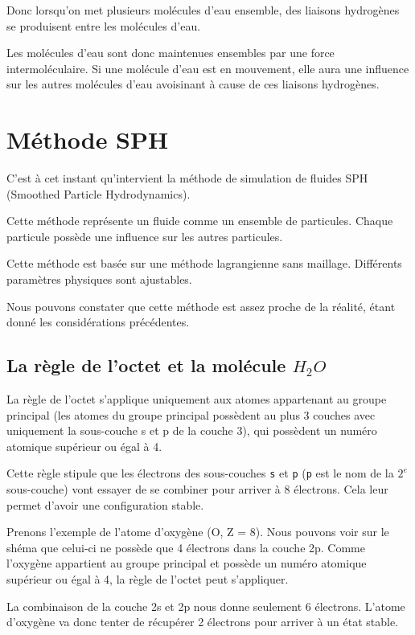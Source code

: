 \documentclass[
]{report}
\begin{document}
Donc lorsqu'on met plusieurs molécules d'eau ensemble, des liaisons
hydrogènes se produisent entre les molécules d'eau.

Les molécules d'eau sont donc maintenues ensembles par une force
intermoléculaire. Si une molécule d'eau est en mouvement, elle aura une
influence sur les autres molécules d'eau avoisinant à cause de ces
liaisons hydrogènes.

\section{Méthode SPH}\label{muxe9thode-sph}

C'est à cet instant qu'intervient la méthode de simulation de fluides
SPH (Smoothed Particle Hydrodynamics).

Cette méthode représente un fluide comme un ensemble de particules.
Chaque particule possède une influence sur les autres particules.

Cette méthode est basée sur une méthode lagrangienne sans maillage.
Différents paramètres physiques sont ajustables.

Nous pouvons constater que cette méthode est assez proche de la réalité,
étant donné les considérations précédentes.

\subsection{\texorpdfstring{La règle de l'octet et la molécule
\(H_{2}O\)}{La règle de l'octet et la molécule H\_\{2\}O}}\label{la-ruxe8gle-de-loctet-et-la-moluxe9cule-h_2o}

La règle de l'octet s'applique uniquement aux atomes appartenant au
groupe principal (les atomes du groupe principal possèdent au plus 3
couches avec uniquement la sous-couche s et p de la couche 3), qui
possèdent un numéro atomique supérieur ou égal à 4.

Cette règle stipule que les électrons des sous-couches \texttt{s} et
\texttt{p} (\texttt{p} est le nom de la \(2^e\) sous-couche) vont
essayer de se combiner pour arriver à 8 électrons. Cela leur permet
d'avoir une configuration stable.

Prenons l'exemple de l'atome d'oxygène (O, Z = 8). Nous pouvons voir sur
le shéma que celui-ci ne possède que 4 électrons dans la couche 2p.
Comme l'oxygène appartient au groupe principal et possède un numéro
atomique supérieur ou égal à 4, la règle de l'octet peut s'appliquer.

La combinaison de la couche 2s et 2p nous donne seulement 6 électrons.
L'atome d'oxygène va donc tenter de récupérer 2 électrons pour arriver à
un état stable.
\end{document}

